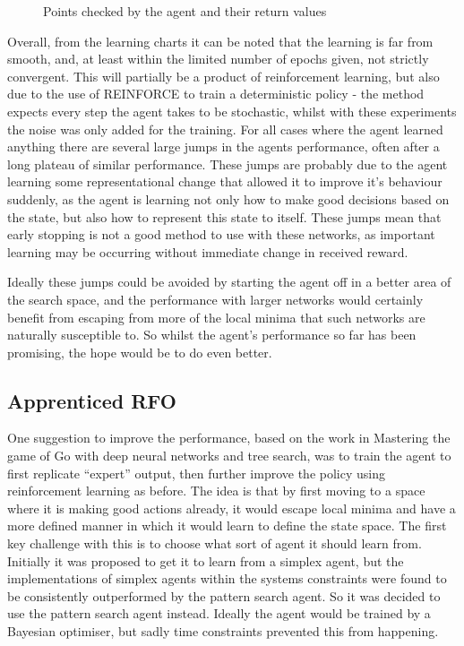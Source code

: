 \begin{figure}
\centering

\caption{Points checked by the agent and their return values}
\label{fig:locexp}
\end{figure}

Overall, from the learning charts it can be noted that the learning is far from smooth, and, at least within the limited number of epochs given, not strictly convergent. This will partially be a product of reinforcement learning, but also due to the use of REINFORCE to train a deterministic policy - the method expects every step the agent takes to be stochastic, whilst with these experiments the noise was only added for the training. For all cases where the agent learned anything there are several large jumps in the agents performance, often after a long plateau of similar performance. These jumps are probably due to the agent learning some representational change that allowed it to improve it's behaviour suddenly, as the agent is learning not only how to make good decisions based on the state, but also how to represent this state to itself. These jumps mean that early stopping is not a good method to use with these networks, as important learning may be occurring without immediate change in received reward.

Ideally these jumps could be avoided by starting the agent off in a better area of the search space, and the performance with larger networks would certainly benefit from escaping from more of the local minima that such networks are naturally susceptible to. So whilst the agent's performance so far has been promising, the hope would be to do even better.

\subsection{Apprenticed RFO}



One suggestion to improve the performance, based on the work in Mastering the game of Go with deep neural networks and tree search\cite{alphaGo}, was to train the agent to first replicate ``expert'' output, then further improve the policy using reinforcement learning as before. The idea is that by first moving to a space where it is making good actions already, it would escape local minima and have a more defined manner in which it would learn to define the state space. The first key challenge with this is to choose what sort of agent it should learn from. Initially it was proposed to get it to learn from a simplex agent, but the implementations of simplex agents within the systems constraints were found to be consistently outperformed by the pattern search agent. So it was decided to use the pattern search agent instead. Ideally the agent would be trained by a Bayesian optimiser, but sadly time constraints prevented this from happening.

